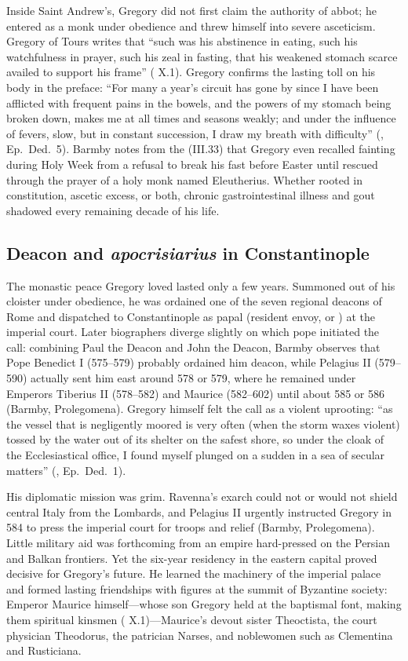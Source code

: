 Inside Saint Andrew's, Gregory did not first claim the authority of abbot; he
entered as a monk under obedience and threw himself into severe asceticism.
Gregory of Tours writes that ``such was his abstinence in eating, such his
watchfulness in prayer, such his zeal in fasting, that his weakened stomach
scarce availed to support his frame'' ( X.1). Gregory
confirms the lasting toll on his body in the  preface: ``For many
a year's circuit has gone by since I have been afflicted with frequent pains in
the bowels, and the powers of my stomach being broken down, makes me at all
times and seasons weakly; and under the influence of fevers, slow, but in
constant succession, I draw my breath with difficulty'' (, Ep.\
Ded.\ 5). Barmby notes from the  (III.33) that Gregory even
recalled fainting during Holy Week from a refusal to break his fast before
Easter until rescued through the prayer of a holy monk named Eleutherius. Whether rooted in constitution, ascetic excess, or both,
chronic gastrointestinal illness and gout shadowed every remaining decade of
his life.

\subsection{Deacon and \emph{apocrisiarius} in Constantinople}

The monastic peace Gregory loved lasted only a few years. Summoned out of his
cloister under obedience, he was ordained one of the seven regional deacons of
Rome and dispatched to Constantinople as papal \latin{apocrisiarius} (resident
envoy, or \latin{responsalis}) at the imperial court. Later biographers diverge
slightly on which pope initiated the call: combining Paul the Deacon and John
the Deacon, Barmby observes that Pope Benedict I (575--579) probably ordained
him deacon, while Pelagius II (579--590) actually sent him east around 578 or
579, where he remained under Emperors Tiberius II (578--582) and Maurice
(582--602) until about 585 or 586 (Barmby, Prolegomena). Gregory himself felt
the call as a violent uprooting: ``as the vessel that is negligently moored is
very often (when the storm waxes violent) tossed by the water out of its
shelter on the safest shore, so under the cloak of the Ecclesiastical office, I
found myself plunged on a sudden in a sea of secular matters''
(, Ep.\ Ded.\ 1).

His diplomatic mission was grim. Ravenna's exarch could not or would not
shield central Italy from the Lombards, and Pelagius II urgently instructed
Gregory in 584 to press the imperial court for troops and relief (Barmby,
Prolegomena). Little military aid was forthcoming from an empire hard-pressed
on the Persian and Balkan frontiers. Yet the six-year residency in the eastern
capital proved decisive for Gregory's future. He learned the machinery of the
imperial palace and formed lasting friendships with figures at the summit of
Byzantine society: Emperor Maurice himself---whose son Gregory held at the
baptismal font, making them spiritual kinsmen (\work{Historia Francorum}
X.1)---Maurice's devout sister Theoctista, the court physician Theodorus, the
patrician Narses, and noblewomen such as Clementina and Rusticiana.

